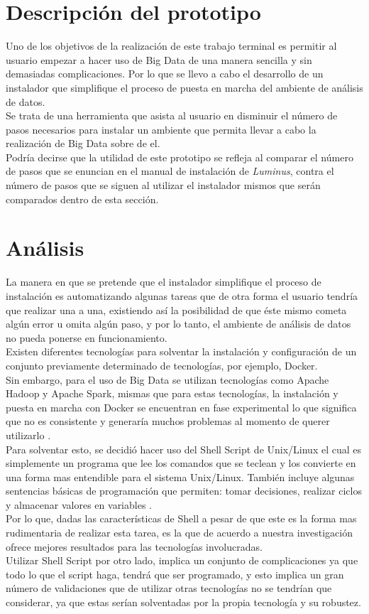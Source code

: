 \section{Descripción del prototipo}
Uno de los objetivos de la realización de este trabajo terminal es permitir al usuario empezar a hacer uso de Big Data de una manera sencilla y sin demasiadas complicaciones. Por lo que se llevo a cabo el desarrollo de un instalador que simplifique el proceso de puesta en marcha del ambiente de análisis de datos.\\
Se trata de una herramienta que asista al usuario en disminuir el número de pasos necesarios para instalar un ambiente que permita llevar a cabo la realización de Big Data sobre de el. 
\\
Podría decirse que la utilidad de este prototipo se refleja al comparar el número de pasos que se enuncian en el manual de instalación de \emph{Luminus}, contra el número de pasos que se siguen al utilizar el instalador mismos que serán comparados dentro de esta sección.\\

\section{Análisis}
La manera en que se pretende que el instalador simplifique el proceso de instalación es automatizando algunas tareas que de otra forma el usuario tendría que realizar una a una, existiendo así la posibilidad de que éste mismo cometa algún error u omita algún paso, y por lo tanto, el ambiente de análisis de datos no pueda ponerse en funcionamiento.\\
Existen diferentes tecnologías para solventar la instalación y configuración de un conjunto previamente determinado de tecnologías, por ejemplo, Docker.\\
Sin embargo, para el uso de Big Data se utilizan tecnologías como Apache Hadoop y Apache Spark, mismas que para estas tecnologías, la instalación y puesta en marcha con Docker se encuentran en fase experimental lo que significa que no es consistente y generaría muchos problemas al momento de querer utilizarlo \cite{dockermalo}.   
\\
Para solventar esto, se decidió hacer uso del Shell Script de Unix/Linux el cual es simplemente un programa que lee los comandos que se teclean y los convierte en una forma mas entendible para el sistema Unix/Linux. También incluye algunas sentencias básicas de programación que permiten: tomar decisiones, realizar ciclos y almacenar valores en variables \cite{Baze}.
\\
Por lo que, dadas las características de Shell a pesar de que este es la forma mas rudimentaria de realizar esta tarea, es la que de acuerdo a nuestra investigación ofrece mejores resultados para las tecnologías involucradas.
\\
Utilizar Shell Script por otro lado, implica un conjunto de complicaciones ya que todo lo que el script haga, tendrá que ser programado, y esto implica un gran número de validaciones que de utilizar otras tecnologías no se tendrían que considerar, ya que estas serían solventadas por la propia tecnología y su robustez.
